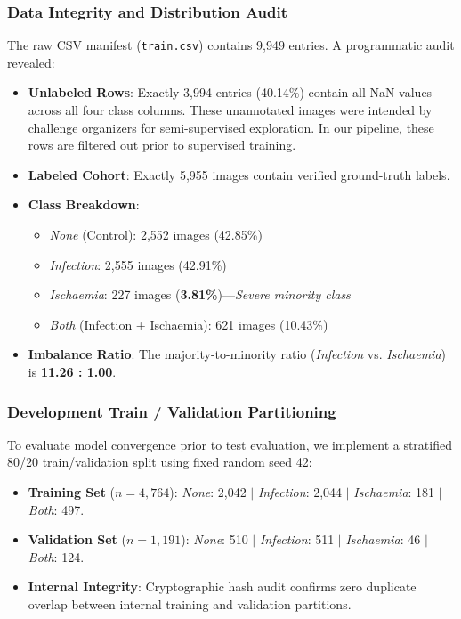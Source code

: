 \documentclass[journal]{IEEEtran}
\begin{document}
\subsubsection{Data Integrity and Distribution Audit}
The raw CSV manifest (\texttt{train.csv}) contains 9,949 entries. A programmatic audit revealed:
\begin{itemize}
    \item \textbf{Unlabeled Rows}: Exactly 3,994 entries (40.14\%) contain all-NaN values across all four class columns. These unannotated images were intended by challenge organizers for semi-supervised exploration. In our pipeline, these rows are filtered out prior to supervised training.
    \item \textbf{Labeled Cohort}: Exactly 5,955 images contain verified ground-truth labels.
    \item \textbf{Class Breakdown}:
    \begin{itemize}
        \item \textit{None} (Control): 2,552 images (42.85\%)
        \item \textit{Infection}: 2,555 images (42.91\%)
        \item \textit{Ischaemia}: 227 images (\textbf{3.81\%})---\textit{Severe minority class}
        \item \textit{Both} (Infection + Ischaemia): 621 images (10.43\%)
    \end{itemize}
    \item \textbf{Imbalance Ratio}: The majority-to-minority ratio (\textit{Infection} vs. \textit{Ischaemia}) is \textbf{11.26 : 1.00}.
\end{itemize}

\subsubsection{Development Train / Validation Partitioning}
To evaluate model convergence prior to test evaluation, we implement a stratified 80/20 train/validation split using fixed random seed 42:
\begin{itemize}
    \item \textbf{Training Set} ($n = 4,764$): \textit{None}: 2,042 $|$ \textit{Infection}: 2,044 $|$ \textit{Ischaemia}: 181 $|$ \textit{Both}: 497.
    \item \textbf{Validation Set} ($n = 1,191$): \textit{None}: 510 $|$ \textit{Infection}: 511 $|$ \textit{Ischaemia}: 46 $|$ \textit{Both}: 124.
    \item \textbf{Internal Integrity}: Cryptographic hash audit confirms zero duplicate overlap between internal training and validation partitions.
\end{itemize}
\end{document}
